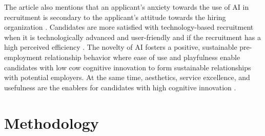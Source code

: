 \documentclass[draft,final]{thesisclass} %
\begin{document}
The article also mentions that an applicant's anxiety towards the use of \acs{AI} in recruitment is secondary to the applicant's attitude towards the hiring organization \parencite[217]{marketing_ai_recruitment}.
Candidates are more satisfied with technology-based recruitment when it is technologically advanced and user-friendly and if the recruitment has a high perceived efficiency \parencite[219]{marketing_ai_recruitment}.
The novelty of \acs{AI} fosters a positive, sustainable pre-employment relationship behavior where ease of use and playfulness enable candidates with low cow cognitive innovation to form sustainable relationships with potential employers. At the same time, aesthetics, service excellence, and usefulness are the enablers for candidates with high cognitive innovation \parencite[220]{marketing_ai_recruitment}.

\chapter{Methodology} \label{methodology}
\end{document}
